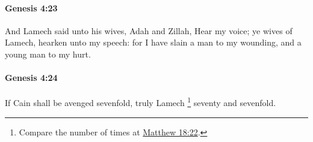 		\paragraph{Genesis 4:23} %
			\label{GENESIS-4-23}

			And Lamech said unto his wives, Adah and Zillah, Hear my voice; ye wives of Lamech, hearken unto my speech: for I have slain a man to my wounding, and a young man to my hurt.


		\paragraph{Genesis 4:24} %
			\label{GENESIS-4-24}

			If Cain shall be avenged sevenfold, truly Lamech
				\footnote{%
					Compare the number of times at \hyperref[MATTHEW-18-22]{Matthew 18:22}.
					}%
			seventy and sevenfold.

